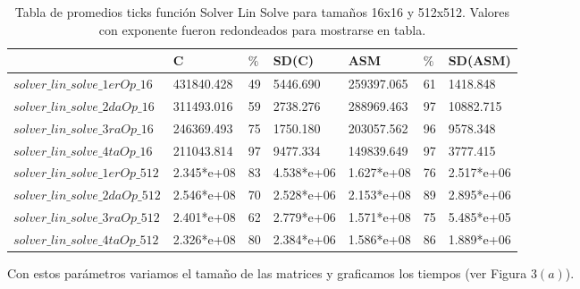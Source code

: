 \begin{table}[htbp]
\begin{center}
\begin{tabular}{|l|l|l|l|l|l|l|}
\hline
  & C & $\%$ &  SD(C)  & ASM & $\%$  & SD(ASM)\\
\hline \hline
$solver\_lin\_solve\_1erOp\_16$ & 431840.428 & 49 & 5446.690 &  259397.065 & 61 &  1418.848\\ \hline

$solver\_lin\_solve\_2daOp\_16$ &  311493.016 & 59 & 2738.276 &  288969.463 & 97 & 10882.715 \\ \hline

$solver\_lin\_solve\_3raOp\_16$ & 246369.493 & 75 & 1750.180  & 203057.562 & 96 & 9578.348 \\ \hline

$solver\_lin\_solve\_4taOp\_16$ & 211043.814 & 97 & 9477.334 &  149839.649 & 97 & 3777.415\\ \hline

 
\hline \hline 


$solver\_lin\_solve\_1erOp\_512$ &  2.345*e+08  & 83 & 4.538*e+06  & 1.627*e+08 & 76 & 2.517*e+06\\ \hline

$solver\_lin\_solve\_2daOp\_512$ & 2.546*e+08  & 70 & 2.528*e+06  & 2.153*e+08 & 89 &  2.895*e+06\\ \hline

$solver\_lin\_solve\_3raOp\_512$ & 2.401*e+08 & 62 &  2.779*e+06 & 1.571*e+08 & 75 &  5.485*e+05\\ \hline

$solver\_lin\_solve\_4taOp\_512$ & 2.326*e+08 & 80 & 2.384*e+06 &  1.586*e+08 & 86 & 1.889*e+06\\ \hline

\end{tabular}
\caption{Tabla de promedios ticks función Solver Lin Solve para tamaños 16x16 y 512x512. Valores con exponente fueron redondeados para mostrarse en tabla.}
\end{center}
\end{table}
Con estos parámetros variamos el tamaño de las matrices y graficamos los tiempos (ver Figura 3$(a)$).

  


